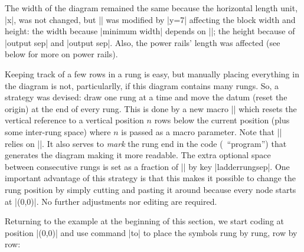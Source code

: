 \documentclass[a4paper]{ltxdoc}
\begin{document}
\noindent{}The width of the diagram remained the same because the horizontal length unit, |x|, was not changed, but |\ladderskip| was modified by |y=7\tikzcircuitssizeunit| affecting the block width and height: the width because |minimum width| depends on |\ladderskip|; the height because of |output sep| and |output sep|. Also, the power rails' length was affected (see below for more on power rails).

Keeping track of a few rows in a rung is easy, but manually placing everything in the diagram is not, particularlly, if this diagram contains many rungs. So, a strategy was devised: draw one rung at a time and move the datum (reset the origin) at the end of every rung. This is done by a new macro |\ladderrungend| which resets the vertical reference to a vertical position $n$ rows below the current position (plus some inter-rung space) where $n$ is passed as a macro parameter. Note that |\ladderrungend| relies on |\ladderskip|. It also serves to \emph{mark} the rung end in the code (\tikzname\ ``program'') that generates the diagram making it more readable. The extra optional space between consecutive rungs is set as a fraction of |\ladderskip| by key |ladderrungsep|. One important advantage of this strategy is that this makes it possible to change the rung position by simply cutting and pasting it around because every node starts at |(0,0)|. No further adjustments nor editing are required.

Returning to the example at the beginning of this section, we start coding at position |(0,0)| and use command |to| to place the symbols rung by rung, row by row:
\end{document}
